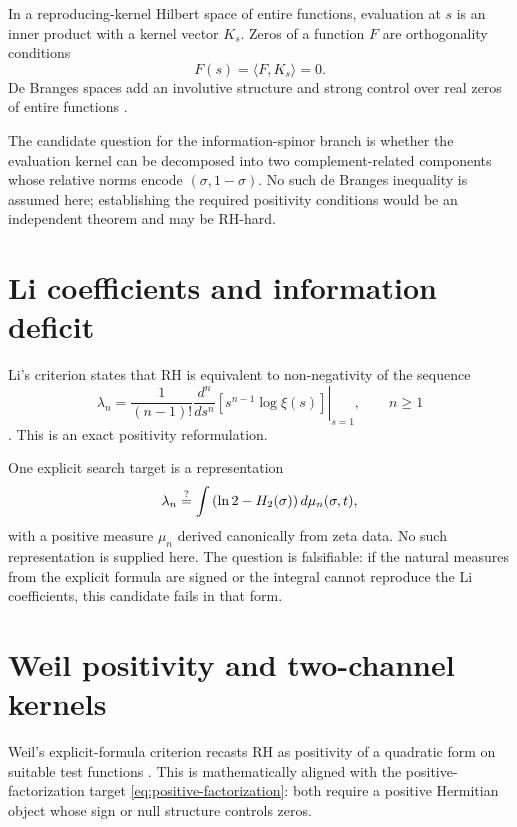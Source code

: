 In a reproducing-kernel Hilbert space of entire functions, evaluation at $s$ is an inner product with a kernel vector $K_s$. Zeros of a function $F$ are orthogonality conditions
\[
 F(s)=\langle F,K_s\rangle=0.
\]
De Branges spaces add an involutive structure and strong control over real zeros of entire functions \citep{debranges1968}.

The candidate question for the information-spinor branch is whether the evaluation kernel can be decomposed into two complement-related components whose relative norms encode $(\sigma,1-\sigma)$. No such de Branges inequality is assumed here; establishing the required positivity conditions would be an independent theorem and may be RH-hard.

\section{Li coefficients and information deficit}

Li's criterion states that RH is equivalent to non-negativity of the sequence
\begin{equation}
 \lambda_n=\frac{1}{(n-1)!}
 \left.\frac{d^n}{ds^n}\left[s^{n-1}\log\xi(s)\right]\right|_{s=1},
 \qquad n\ge1
 \label{eq:li-coefficients}
\end{equation}
\citep{li1997}. This is an exact positivity reformulation.

One explicit search target is a representation
\begin{equation}
 \lambda_n\stackrel{?}{=}\int\left(\ln2-H_2(\sigma)\right)d\mu_n(\sigma,t),
 \label{eq:li-entropy-candidate}
\end{equation}
with a positive measure $\mu_n$ derived canonically from zeta data. No such representation is supplied here. The question is falsifiable: if the natural measures from the explicit formula are signed or the integral cannot reproduce the Li coefficients, this candidate fails in that form.

\section{Weil positivity and two-channel kernels}

Weil's explicit-formula criterion recasts RH as positivity of a quadratic form on suitable test functions \citep{weil1952}. This is mathematically aligned with the positive-factorization target \cref{eq:positive-factorization}: both require a positive Hermitian object whose sign or null structure controls zeros.

